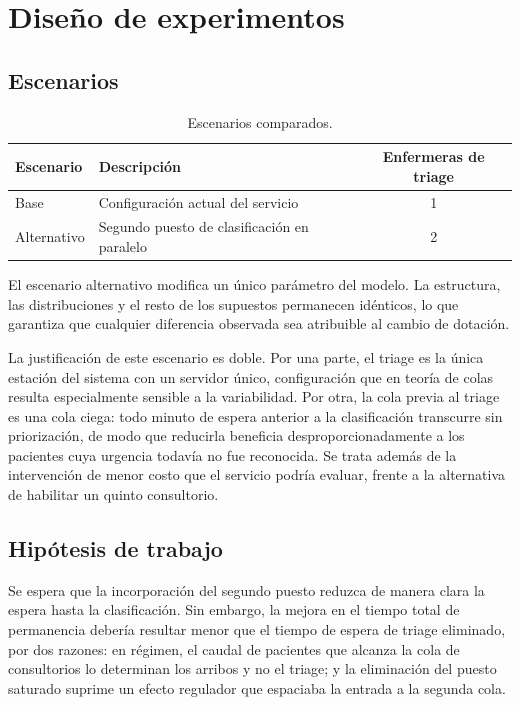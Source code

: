 \section{Diseño de experimentos}

\subsection{Escenarios}

\begin{table}[H]
\centering
\begin{tabular}{llc}
\toprule
\textbf{Escenario} & \textbf{Descripción} & \textbf{Enfermeras de triage} \\
\midrule
Base        & Configuración actual del servicio & 1 \\
Alternativo & Segundo puesto de clasificación en paralelo & 2 \\
\bottomrule
\end{tabular}
\caption{Escenarios comparados.}
\end{table}

El escenario alternativo modifica un único parámetro del modelo. La
estructura, las distribuciones y el resto de los supuestos permanecen
idénticos, lo que garantiza que cualquier diferencia observada sea atribuible
al cambio de dotación.

La justificación de este escenario es doble. Por una parte, el triage es la
única estación del sistema con un servidor único, configuración que en teoría
de colas resulta especialmente sensible a la variabilidad. Por otra, la cola
previa al triage es una cola ciega: todo minuto de espera anterior a la
clasificación transcurre sin priorización, de modo que reducirla beneficia
desproporcionadamente a los pacientes cuya urgencia todavía no fue
reconocida. Se trata además de la intervención de menor costo que el servicio
podría evaluar, frente a la alternativa de habilitar un quinto consultorio.

\subsection{Hipótesis de trabajo}

Se espera que la incorporación del segundo puesto reduzca de manera clara la
espera hasta la clasificación. Sin embargo, la mejora en el tiempo total de
permanencia debería resultar menor que el tiempo de espera de triage
eliminado, por dos razones: en régimen, el caudal de pacientes que alcanza la
cola de consultorios lo determinan los arribos y no el triage; y la
eliminación del puesto saturado suprime un efecto regulador que espaciaba la
entrada a la segunda cola.

